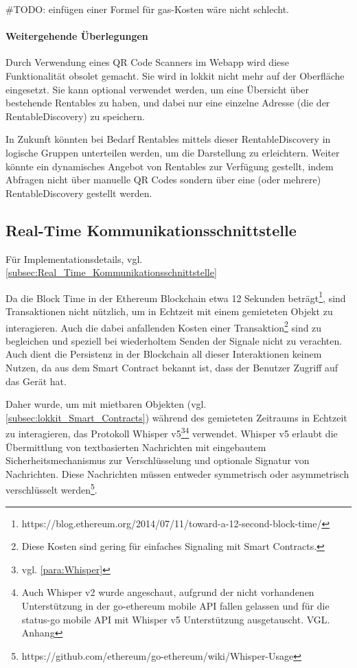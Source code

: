 \#TODO: einfügen einer Formel für gas-Kosten wäre nicht schlecht.

\paragraph{Weitergehende Überlegungen}
Durch Verwendung eines QR Code Scanners im Webapp wird diese Funktionalität obsolet gemacht. Sie wird in lokkit nicht mehr auf der Oberfläche eingesetzt. Sie kann optional verwendet werden, um eine Übersicht über bestehende Rentables zu haben, und dabei nur eine einzelne Adresse (die der RentableDiscovery) zu speichern.

In Zukunft könnten bei Bedarf Rentables mittels dieser RentableDiscovery in logische Gruppen unterteilen werden, um die Darstellung zu erleichtern. Weiter könnte ein dynamisches Angebot von Rentables zur Verfügung gestellt, indem Abfragen nicht über manuelle QR Codes sondern über eine (oder mehrere) RentableDiscovery gestellt werden.

\subsection{Real-Time Kommunikationsschnittstelle}
Für Implementationsdetails, vgl. \ref{subsec:Real_Time_Kommunikationsschnittstelle}

Da die Block Time in der Ethereum Blockchain etwa 12 Sekunden beträgt\footnote{https://blog.ethereum.org/2014/07/11/toward-a-12-second-block-time/}, sind Transaktionen nicht nützlich, um in Echtzeit mit einem gemieteten Objekt zu interagieren. Auch die dabei anfallenden Kosten einer Transaktion\footnote{Diese Kosten sind gering für einfaches Signaling mit Smart Contracts.} sind zu begleichen und speziell bei wiederholtem Senden der Signale nicht zu verachten. Auch dient die Persistenz in der Blockchain all dieser Interaktionen keinem Nutzen, da aus dem Smart Contract bekannt ist, dass der Benutzer Zugriff auf das Gerät hat.

Daher wurde, um mit mietbaren Objekten (vgl. \ref{subsec:lokkit_Smart_Contracts}) während des gemieteten Zeitraums in Echtzeit zu interagieren, das Protokoll Whisper v5\footnote{vgl. \ref{para:Whisper}}\footnote{Auch Whisper v2 wurde angeschaut, aufgrund der nicht vorhandenen Unterstützung in der go-ethereum mobile API fallen gelassen und für die status-go mobile API mit Whisper v5 Unterstützung ausgetauscht. VGL. Anhang} verwendet. Whisper v5 erlaubt die Übermittlung von textbasierten Nachrichten mit eingebautem Sicherheitsmechanismus zur Verschlüsselung und optionale Signatur von Nachrichten. Diese Nachrichten müssen entweder symmetrisch oder asymmetrisch verschlüsselt werden\footnote{https://github.com/ethereum/go-ethereum/wiki/Whisper-Usage}.

